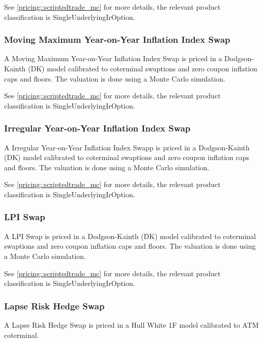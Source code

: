 See \ref{pricing::scriptedtrade_mc} for more details, the relevant product classification is SingleUnderlyingIrOption.

\subsubsection{Moving Maximum Year-on-Year Inflation Index Swap}
\label{pricing::movingMaximumYYIIS}

A Moving Maximum Year-on-Year Inflation Index Swap is priced in a Dodgson-Kainth (DK) model calibrated to coterminal
swaptions and zero coupon inflation caps and floors. The valuation is done using a Monte Carlo simulation.

See \ref{pricing::scriptedtrade_mc} for more details, the relevant product classification is SingleUnderlyingIrOption.

\subsubsection{Irregular Year-on-Year Inflation Index Swap}
\label{pricing::irregularYYIIS}

A Irregular Year-on-Year Inflation Index Swapp is priced in a Dodgson-Kainth (DK) model calibrated to coterminal
swaptions and zero coupon inflation caps and floors. The valuation is done using a Monte Carlo simulation.

See \ref{pricing::scriptedtrade_mc} for more details, the relevant product classification is SingleUnderlyingIrOption.


\subsubsection{LPI Swap}
\label{pricing::lpiswap}

A LPI Swap is priced in a Dodgson-Kainth (DK) model calibrated to coterminal
swaptions and zero coupon inflation caps and floors. The valuation is done using a Monte Carlo simulation.

See \ref{pricing::scriptedtrade_mc} for more details, the relevant product classification is SingleUnderlyingIrOption.


\subsubsection{Lapse Risk Hedge Swap}
\label{pricing::lapse_risk_hedge_swap}

A Lapse Risk Hedge Swap is priced in a Hull White 1F model calibrated to ATM coterminal. 

